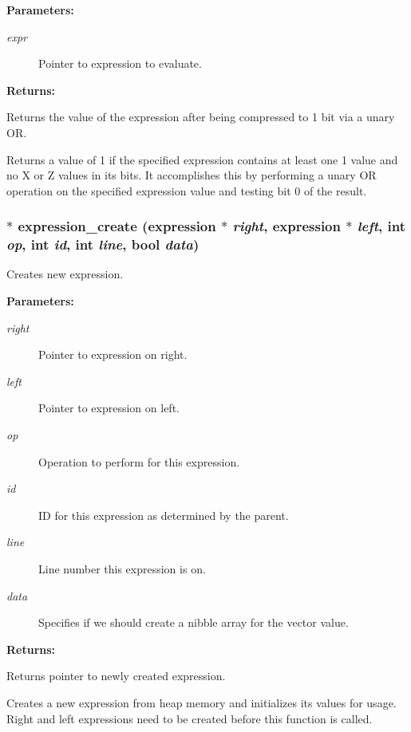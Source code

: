 \begin{Desc}
\item[{\bf Parameters: }]\par
\begin{description}
\item[
{\em expr}]Pointer to expression to evaluate.

\end{description}
\end{Desc}
\begin{Desc}
\item[{\bf Returns: }]\par
Returns the value of the expression after being compressed to 1 bit via a unary OR.

\end{Desc}
Returns a value of 1 if the specified expression contains at least one 1 value and no X or Z values in its bits. It accomplishes this by performing a unary  OR operation on the specified expression value and testing bit 0 of the result. 
\subsubsection{$\ast$ expression\_\-create ({\bf expression} $\ast$ {\em right}, {\bf expression} $\ast$ {\em left}, int {\em op}, int {\em id}, int {\em line}, {\bf bool} {\em data})}\label{expr_8h_a1}


Creates new expression.

\begin{Desc}
\item[{\bf Parameters: }]\par
\begin{description}
\item[
{\em right}]Pointer to expression on right. \item[
{\em left}]Pointer to expression on left. \item[
{\em op}]Operation to perform for this expression. \item[
{\em id}]ID for this expression as determined by the parent. \item[
{\em line}]Line number this expression is on. \item[
{\em data}]Specifies if we should create a nibble array for the vector value.

\end{description}
\end{Desc}
\begin{Desc}
\item[{\bf Returns: }]\par
Returns pointer to newly created expression.

\end{Desc}
Creates a new expression from heap memory and initializes its values for usage. Right and left expressions need to be created before this function is called. 
